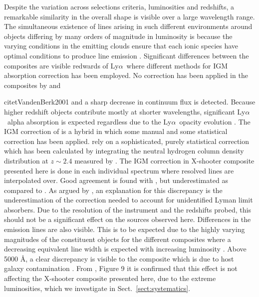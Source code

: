 \documentclass{aa}    %
\newcommand{\sectionname}{Sect.}
\newcommand{\Sect}[1]{\sectionname~\ref{sect:#1}}
\newcommand{\sect}[1]{\Sect{#1}}
\newcommand{\lya}{Ly$\alpha$}
\begin{document}
Despite the variation across selections criteria, luminosities and redshifts, a remarkable similarity in the overall shape is visible over a large wavelength range. The simultaneous existence of lines arising in such different environments around objects differing by many orders of magnitude in luminosity is because the varying conditions in the emitting clouds ensure that each ionic species have optimal conditions to produce line emission \citep{Baldwin1995}.  Significant differences between the composites are visible redwards of \lya~where different methods for IGM absorption correction has been employed. No correction has been applied in the composites by \citet{Francis1991} and {citet{VandenBerk2001} and a sharp decrease in continuum flux is detected. Because higher redshift objects contribute mostly at shorter wavelengths, significant \lya~alpha absorption is expected regardless due to the \lya~opacity evolution \citep{Moller1990, Madau1995}. The IGM correction of \citet{Telfer2002} is a hybrid in which some manual and some statistical correction has been applied. \citet{Lusso2015} rely on a sophisticated, purely statistical correction which has been calculated by integrating the neutral hydrogen column density distribution at $z \sim 2.4$ measured by \cite{Prochaska2014b}. The IGM correction in X-shooter composite presented here is done in each individual spectrum where resolved lines are interpolated over. Good agreement is found with \cite{Telfer2002}, but underestimated as compared to \cite{Lusso2015}. As argued by \cite{Lusso2015}, an explanation for this discrepancy is the underestimation of the correction needed to account for unidentified Lyman limit absorbers. Due to the resolution of the instrument and the redshifts probed, this should not be a significant effect on the sources observed here. 
Differences in the emission lines are also visible. This is to be expected due to the highly varying magnitudes of the constituent objects for the different composites where a decreasing equivalent line width is expected with increasing luminosity \citep{Baldwin1977}. 
Above 5000 \AA, a clear discrepancy is visible to the \citet{VandenBerk2001} composite which is due to host galaxy contamination \citep{Glikman2006}. From \citet{Shen2011}, Figure 9 it is confirmed that this effect is not affecting the X-shooter composite presented here, due to the extreme luminosities, which we investigate in \sect{systematics}.
 \begin{figure*}[t!]
   \centering

\end{figure*}}
\end{document}
